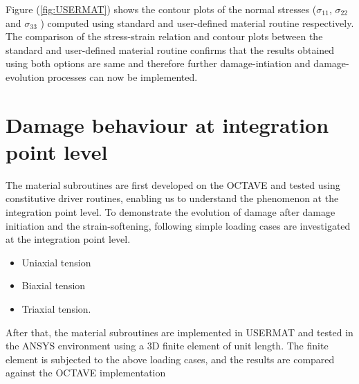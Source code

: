 \documentclass[12pt,twoside]{report}
\begin{document}
Figure (\ref{fig:USERMAT}) shows the contour plots of the normal stresses ($\sigma_{11}$, $\sigma_{22}$ and $\sigma_{33}$ ) computed using standard and user-defined material routine respectively. The comparison of the stress-strain relation and contour plots between the standard and user-defined material routine confirms that the results obtained using both options are same and therefore further damage-intiation and damage-evolution processes can now be implemented.
\section{Damage behaviour at integration point level}
\indent\indent\indent The material subroutines are first developed on the OCTAVE and tested using constitutive driver routines, enabling us to understand the phenomenon at the integration point level. To demonstrate the evolution of damage after damage initiation and the strain-softening, following simple loading cases are investigated at the integration point level.
\begin{itemize}
\item Uniaxial tension
\item Biaxial tension
\item Triaxial tension.
\end{itemize} 
After that, the material subroutines are implemented in USERMAT and tested in the ANSYS environment using a 3D finite element of unit length. The finite element is subjected to the above loading cases, and the results are compared against the OCTAVE implementation
\FloatBarrier
\end{document}
